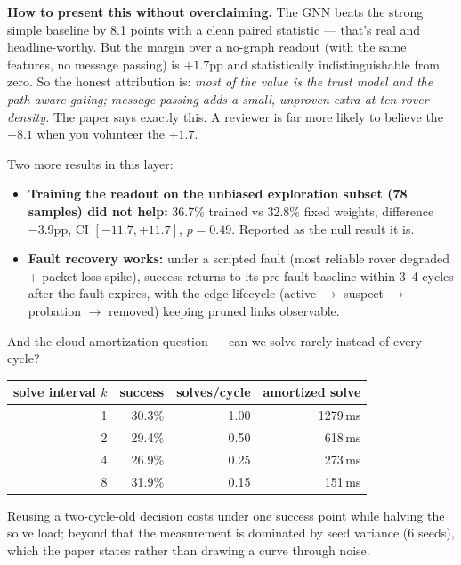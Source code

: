 \documentclass[11pt]{article}
\newenvironment{card}{%
  \def\FrameCommand{\fboxsep=8pt\fcolorbox{cardline}{cardbg}}%
  \MakeFramed{\advance\hsize-\width\FrameRestore}\noindent}{\endMakeFramed}
\begin{document}
\begin{card}
\textbf{How to present this without overclaiming.} The GNN beats the
strong simple baseline by 8.1 points with a clean paired statistic ---
that's real and headline-worthy. But the margin over a no-graph readout
(with the same features, no message passing) is $+1.7$pp and statistically
indistinguishable from zero. So the honest attribution is: \emph{most of
the value is the trust model and the path-aware gating; message passing
adds a small, unproven extra at ten-rover density.} The paper says exactly
this. A reviewer is far more likely to believe the $+8.1$ when you volunteer
the $+1.7$.
\end{card}

Two more results in this layer:

\begin{itemize}
\item \textbf{Training the readout on the unbiased exploration subset (78
samples) did not help:} 36.7\% trained vs 32.8\% fixed weights, difference
$-3.9$pp, CI $[-11.7,+11.7]$, $p=0.49$. Reported as the null result it is.
\item \textbf{Fault recovery works:} under a scripted fault (most reliable
rover degraded + packet-loss spike), success returns to its pre-fault
baseline within 3--4 cycles after the fault expires, with the edge
lifecycle (active $\rightarrow$ suspect $\rightarrow$ probation $\rightarrow$
removed) keeping pruned links observable.
\end{itemize}

And the cloud-amortization question --- can we solve rarely instead of
every cycle?

\begin{center}
\begin{tabular}{rrrr}
\toprule
solve interval $k$ & success & solves/cycle & amortized solve \\
\midrule
1 & 30.3\% & 1.00 & 1279\,ms \\
2 & 29.4\% & 0.50 & 618\,ms \\
4 & 26.9\% & 0.25 & 273\,ms \\
8 & 31.9\% & 0.15 & 151\,ms \\
\bottomrule
\end{tabular}
\end{center}

Reusing a two-cycle-old decision costs under one success point while
halving the solve load; beyond that the measurement is dominated by seed
variance (6 seeds), which the paper states rather than drawing a curve
through noise.
\end{document}
